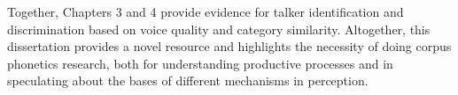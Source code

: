 Together, Chapters 3 and 4 provide evidence for talker identification and discrimination based on voice quality and category similarity. Altogether, this dissertation provides a novel resource and highlights the necessity of doing corpus phonetics research, both for understanding productive processes and in speculating about the bases of different mechanisms in perception. 


\endinput %
